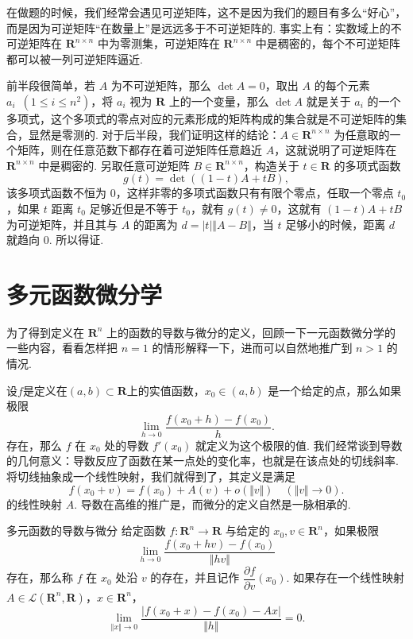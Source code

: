 在做题的时候，我们经常会遇见可逆矩阵，这不是因为我们的题目有多么“好心”，而是因为可逆矩阵“在数量上”是远远多于不可逆矩阵的. 事实上有：实数域上的不可逆矩阵在 $\mathbf{R}^{n\times n}$ 中为零测集，可逆矩阵在 $\mathbf{R}^{n\times n}$ 中是稠密的，每个不可逆矩阵都可以被一列可逆矩阵逼近.

前半段很简单，若 $A$ 为不可逆矩阵，那么 $\det A = 0$，取出 $A$ 的每个元素 $a_i \enspace(1\leqslant i\leqslant n^2)$，将 $a_i$ 视为 $\mathbf{R}$ 上的一个变量，那么 $\det A$ 就是关于 $a_i$ 的一个多项式，这个多项式的零点对应的元素形成的矩阵构成的集合就是不可逆矩阵的集合，显然是零测的. 对于后半段，我们证明这样的结论：$A\in\mathbf{R}^{n\times n}$ 为任意取的一个矩阵，则在任意范数下都存在着可逆矩阵任意趋近 $A$，这就说明了可逆矩阵在 $\mathbf{R}^{n\times n}$ 中是稠密的. 另取任意可逆矩阵 $B\in\mathbf{R}^{n\times n}$，构造关于 $t\in \mathbf{R}$ 的多项式函数 \[g(t) = \det((1 - t)A + tB),\]
该多项式函数不恒为 $0$，这样非零的多项式函数只有有限个零点，任取一个零点 $t_0$，如果 $t$ 距离 $t_0$ 足够近但是不等于 $t_0$，就有 $g(t) \neq0$，这就有 $(1 - t)A + tB$ 为可逆矩阵，并且其与 $A$ 的距离为 $d = \vert t\vert \Vert A - B\Vert$，当 $t$ 足够小的时候，距离 $d$ 就趋向 $0$. 所以得证.

\section{多元函数微分学}

为了得到定义在 $\mathbf{R}^n$ 上的函数的导数与微分的定义，回顾一下一元函数微分学的一些内容，看看怎样把 $n=1$ 的情形解释一下，进而可以自然地推广到 $n>1$ 的情况.

设$f$是定义在$(a,b)\subset \mathbf{R}$上的实值函数，$x_0\in (a,b)$ 是一个给定的点，那么如果极限 \[\lim_{h\to 0}\frac{f(x_0 + h)-f(x_0)}{h}.\]
存在，那么 $f$ 在 $x_0$ 处的导数 $f'(x_0)$ 就定义为这个极限的值. 我们经常谈到导数的几何意义：导数反应了函数在某一点处的变化率，也就是在该点处的切线斜率. 将切线抽象成一个线性映射，我们就得到了，其定义是满足 \[f(x_0 + v) = f(x_0) + A(v) + o(\Vert v\Vert) \quad (\Vert v\Vert\to 0).\]
的线性映射 $A$. 导数在高维的推广是，而微分的定义自然是一脉相承的.

\begin{definition}{多元函数的导数与微分}{}
    给定函数 $f\colon \mathbf{R}^n\to\mathbf{R}$ 与给定的 $x_0, v\in\mathbf{R}^n$，如果极限 \[\lim_{h\to 0}\frac{f(x_0 + hv) - f(x_0)}{\Vert hv\Vert}\] 存在，那么称 $f$ 在 $x_0$ 处沿 $v$ 的存在，并且记作 $\dfrac{\partial f}{\partial v}(x_0)$. 如果存在一个线性映射 $A\in \mathcal{L}(\mathbf{R}^n, \mathbf{R})$，$x\in \mathbf{R}^n$，
    \[\lim\limits_{\Vert x \Vert \to0}\frac{\vert f(x_0 + x) - f(x_0) - Ax \vert}{\Vert h \Vert} = 0.\]

\end{definition}

